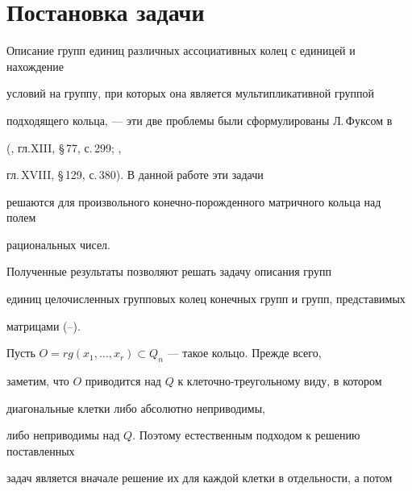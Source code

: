 

\maketitle


\label{begin}











\section{Постановка задачи}





Описание групп единиц различных ассоциативных колец с единицей и нахождение


условий на группу, при которых она является мультипликативной группой


подходящего кольца, --- эти две проблемы были сформулированы Л.\,Фуксом в


(\cite{Fuch1}, гл.XIII, \S\,77, с.\,299; \cite{Fuch2},


гл.\,XVIII, \S\,129, с.\,380). В данной работе эти задачи


решаются для произвольного конечно-порожденного матричного кольца над полем


рациональных чисел.





Полученные результаты позволяют решать задачу описания групп 


единиц целочисленных групповых колец конечных групп и групп, представимых


матрицами (\cite{Good}--\cite{Al}).





Пусть $O=rg(x_{1},\dotsc,x_{r})\subset Q_{n}$ --- такое кольцо. Прежде всего,


заметим, что $O$ приводится над $Q$ к клеточно-треугольному виду, в котором


диагональные клетки либо абсолютно неприводимы,


либо неприводимы над $Q$. Поэтому естественным подходом к решению поставленных


задач является вначале решение их для каждой клетки в отдельности, а потом


